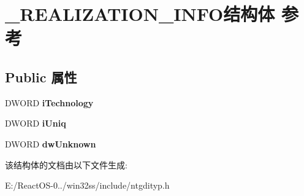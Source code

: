\hypertarget{struct___r_e_a_l_i_z_a_t_i_o_n___i_n_f_o}{}\section{\+\_\+\+R\+E\+A\+L\+I\+Z\+A\+T\+I\+O\+N\+\_\+\+I\+N\+F\+O结构体 参考}
\label{struct___r_e_a_l_i_z_a_t_i_o_n___i_n_f_o}
\subsection*{Public 属性}
\begin{DoxyCompactItemize}
\item 
\mbox{\label{struct___r_e_a_l_i_z_a_t_i_o_n___i_n_f_o_a3112daa6afa809a829f619e93cdc385a}} 
D\+W\+O\+RD {\bfseries i\+Technology}
\item 
\mbox{\label{struct___r_e_a_l_i_z_a_t_i_o_n___i_n_f_o_a221449f29e33e4d1bd906b4b78a8152a}} 
D\+W\+O\+RD {\bfseries i\+Uniq}
\item 
\mbox{\label{struct___r_e_a_l_i_z_a_t_i_o_n___i_n_f_o_af6d23f1957fcb9539b05db9df4646036}} 
D\+W\+O\+RD {\bfseries dw\+Unknown}
\end{DoxyCompactItemize}


该结构体的文档由以下文件生成\+:\begin{DoxyCompactItemize}
\item 
E\+:/\+React\+O\+S-\/0../win32ss/include/ntgdityp.\+h\end{DoxyCompactItemize}
